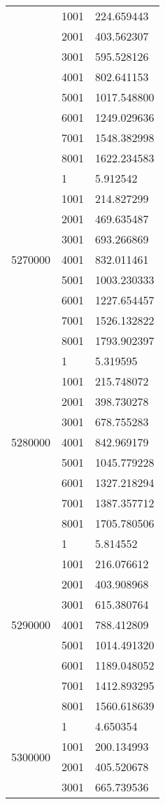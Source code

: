 \begin{table}[htb!]
\begin{tabular}{lll}
 & 1001 & 224.659443 \\
 & 2001 & 403.562307 \\
 & 3001 & 595.528126 \\
 & 4001 & 802.641153 \\
 & 5001 & 1017.548800 \\
 & 6001 & 1249.029636 \\
 & 7001 & 1548.382998 \\
 & 8001 & 1622.234583 \\
\multirow[c]{9}{*}{5270000} & 1 & 5.912542 \\
 & 1001 & 214.827299 \\
 & 2001 & 469.635487 \\
 & 3001 & 693.266869 \\
 & 4001 & 832.011461 \\
 & 5001 & 1003.230333 \\
 & 6001 & 1227.654457 \\
 & 7001 & 1526.132822 \\
 & 8001 & 1793.902397 \\
\multirow[c]{9}{*}{5280000} & 1 & 5.319595 \\
 & 1001 & 215.748072 \\
 & 2001 & 398.730278 \\
 & 3001 & 678.755283 \\
 & 4001 & 842.969179 \\
 & 5001 & 1045.779228 \\
 & 6001 & 1327.218294 \\
 & 7001 & 1387.357712 \\
 & 8001 & 1705.780506 \\
\multirow[c]{9}{*}{5290000} & 1 & 5.814552 \\
 & 1001 & 216.076612 \\
 & 2001 & 403.908968 \\
 & 3001 & 615.380764 \\
 & 4001 & 788.412809 \\
 & 5001 & 1014.491320 \\
 & 6001 & 1189.048052 \\
 & 7001 & 1412.893295 \\
 & 8001 & 1560.618639 \\
\multirow[c]{9}{*}{5300000} & 1 & 4.650354 \\
 & 1001 & 200.134993 \\
 & 2001 & 405.520678 \\
 & 3001 & 665.739536 \\

\end{tabular}
\end{table}
